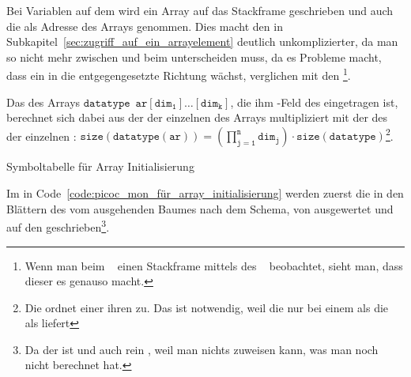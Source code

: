 Bei Variablen auf dem  wird ein Array  auf das Stackframe geschrieben und auch die  als Adresse des Arrays genommen. Dies macht den  in Subkapitel~\ref{sec:zugriff_auf_ein_arrayelement} deutlich unkomplizierter, da man so nicht mehr zwischen  und  beim  unterscheiden muss, da es Probleme macht, dass ein  in die entgegengesetzte Richtung wächst, verglichen mit den \footnote{Wenn man beim ~\cite{noauthor_gcc_nodate} einen Stackframe mittels des ~\cite{noauthor_gcc_nodate} beobachtet, sieht man, dass dieser es genauso macht.}.

\begin{Special_Paragraph}
  Das  des Arrays $\mathtt{datatype \enspace ar[dim_1]\ldots[dim_k]}$, die ihm -Feld des  eingetragen ist, berechnet sich dabei aus der  der einzelnen  des Arrays multipliziert mit der  des  der einzelnen : $\mathtt{size(datatype(ar)) = \left(\prod^n_{j=1} dim_j\right)\cdot size(datatype)}$\footnote{Die    ordnet einer   ihren  zu. Das ist notwendig, weil die   nur bei einem  als  die  als  liefert}.
\end{Special_Paragraph}

\begin{code}
  \centering
  \caption{Symboltabelle für Array Initialisierung}
  \label{code:symboltabelle_für_array_initialisierung}
\end{code}

Im  in Code~\ref{code:picoc_mon_für_array_initialisierung} werden zuerst die  in den Blättern des vom   ausgehenden Baumes  nach dem  Schema, von  ausgewertet und auf den  geschrieben\footnote{Da der  \smalltt{=}  ist und auch rein , weil man nichts zuweisen kann, was man noch nicht berechnet hat.}.

